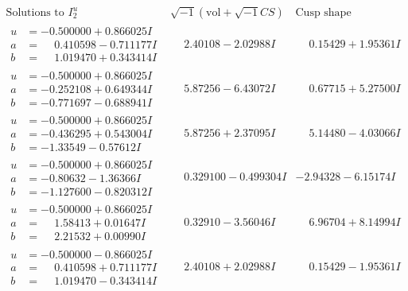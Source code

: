 \documentclass[1p]{elsarticle_modified}
\theoremstyle{definition}
\newcommand{\I}{\sqrt{-1}}
\begin{document}
$$\begin{array}{c|c|c}  
\text{Solutions to }I^u_{2}& \I (\text{vol} + \sqrt{-1}CS) & \text{Cusp shape}\\
 \hline 
\begin{aligned}
u &= -0.500000 + 0.866025 I \\
a &= \phantom{-}0.410598 - 0.711177 I \\
b &= \phantom{-}1.019470 + 0.343414 I\end{aligned}
 & \phantom{-}2.40108 - 2.02988 I & \phantom{-}0.15429 + 1.95361 I \\ \hline\begin{aligned}
u &= -0.500000 + 0.866025 I \\
a &= -0.252108 + 0.649344 I \\
b &= -0.771697 - 0.688941 I\end{aligned}
 & \phantom{-}5.87256 - 6.43072 I & \phantom{-}0.67715 + 5.27500 I \\ \hline\begin{aligned}
u &= -0.500000 + 0.866025 I \\
a &= -0.436295 + 0.543004 I \\
b &= -1.33549 - 0.57612 I\end{aligned}
 & \phantom{-}5.87256 + 2.37095 I & \phantom{-}5.14480 - 4.03066 I \\ \hline\begin{aligned}
u &= -0.500000 + 0.866025 I \\
a &= -0.80632 - 1.36366 I \\
b &= -1.127600 - 0.820312 I\end{aligned}
 & \phantom{-}0.329100 - 0.499304 I & -2.94328 - 6.15174 I \\ \hline\begin{aligned}
u &= -0.500000 + 0.866025 I \\
a &= \phantom{-}1.58413 + 0.01647 I \\
b &= \phantom{-}2.21532 + 0.00990 I\end{aligned}
 & \phantom{-}0.32910 - 3.56046 I & \phantom{-}6.96704 + 8.14994 I \\ \hline\begin{aligned}
u &= -0.500000 - 0.866025 I \\
a &= \phantom{-}0.410598 + 0.711177 I \\
b &= \phantom{-}1.019470 - 0.343414 I\end{aligned}
 & \phantom{-}2.40108 + 2.02988 I & \phantom{-}0.15429 - 1.95361 I \\ \hline\begin{aligned}

\end{aligned}
\end{array}$$
\end{document}

